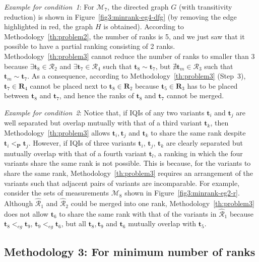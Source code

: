 \documentclass[acmsmall,screen, review]{acmart}
\begin{document}
\textit{Example for condition~1}: For $\mathcal{M}_7$, the directed graph $G$ (with transitivity reduction) is shown in Figure~\ref{fig3:minrank-eg4-dfg} (by removing the edge highlighted in red, the graph $H$ is obtained). According to Methodology~\ref{th:problem2}, the number of ranks is 5, and we just saw that it possible to have a partial ranking consisting of 2 ranks. Methodology~\ref{th:problem3} cannot reduce the number of ranks to smaller than 3 because $\exists \mathbf{t}_8 \in \mathcal{R}_2$ and $\exists \mathbf{t}_7 \in \mathcal{R}_4$ such that $\mathbf{t}_8 \sim \mathbf{t}_7$, but  $\nexists \mathbf{t}_m \in \mathcal{R}_3$ such that $\mathbf{t}_m \sim \mathbf{t}_7$. As a consequence, according to Methodology~\ref{th:problem3} (Step~3), $\mathbf{t}_7 \in \mathbf{R}_4$ cannot be placed next to $\mathbf{t}_8 \in \mathbf{R}_2$ because $\mathbf{t}_5 \in \mathbf{R}_3$ has to be placed between $\mathbf{t}_8$ and $\mathbf{t}_7$, and hence the ranks of $\mathbf{t}_8$ and $\mathbf{t}_7$ cannot be merged.


\textit{Example for condition~2}: Notice that, if  IQIs of any two variants $\mathbf{t}_i$ and $\mathbf{t}_j$ are well separated but overlap mutually with that of a third variant $\mathbf{t}_k$, then Methodology~\ref{th:problem3} allows  $\mathbf{t}_i, \mathbf{t}_j$ and $\mathbf{t}_k$ to share the same rank despite $\mathbf{t}_i <_{\mathbf{P}} \mathbf{t}_j$. However, if IQIs of three variants $\mathbf{t}_i$, $\mathbf{t}_j$, $\mathbf{t}_k$ are clearly separated but mutually overlap with that of a fourth variant $\mathbf{t}_l$, a ranking in which the four variants share the same rank is not possible. This is because, for the variants to share the same rank, Methodology~\ref{th:problem3} requires an arrangement of the variants such that adjacent pairs of variants  are incomparable. For example, consider the sets of measurements $\mathcal{M}_8$ shown in Figure~\ref{fig3:minrank-eg2-r}. Although $\mathcal{\hat{R}}_1$ and  $\mathcal{\hat{R}}_2$ could be merged into one rank, Methodology~\ref{th:problem3} does not allow $\mathbf{t}_6$ to share the same rank with that of the variants in $\mathcal{\hat{R}}_1$ because $\mathbf{t}_8 <_{eg} \mathbf{t}_9$, $\mathbf{t}_9 <_{eg} \mathbf{t}_6$, but all   $\mathbf{t}_8, \mathbf{t}_9$ and $\mathbf{t}_6$ mutually overlap with $\mathbf{t}_5$.


\subsection{Methodology 3: For minimum number of ranks}
\end{document}
